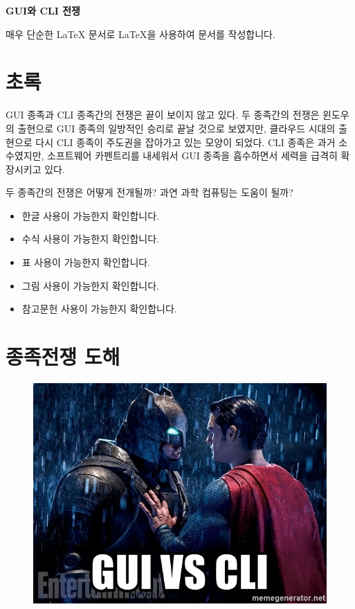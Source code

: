 \documentclass[12pt]{article}
\begin{document}
\textbf{GUI와 CLI 전쟁}

\bigskip

매우 단순한 \LaTeX\/ 문서로 \LaTeX\/을 사용하여 문서를 작성합니다.


\section{초록}

GUI 종족과 CLI 종족간의 전쟁은 끝이 보이지 않고 있다.
두 종족간의 전쟁은 윈도우의 출현으로 GUI 종족의 일방적인 승리로 끝날 것으로 보였지만, 클라우드 시대의 출현으로 다시 CLI 종족이 주도권을 잡아가고 있는 모양이 되었다.
CLI 종족은 과거 소수였지만, 소프트웨어 카펜트리\cite{DBLP:journals/corr/SimperlerW15}를 내세워서 GUI 종족을 흡수하면서 세력을 급격히 확장시키고 있다.

두 종족간의 전쟁은 어떻게 전개될까? 과연 과학 컴퓨팅\cite{10.1371/journal.pbio.1001745}는 도움이 될까?

\begin{itemize}
  \item 한글 사용이 가능한지 확인합니다.
  \item 수식 사용이 가능한지 확인합니다.
  \item 표 사용이 가능한지 확인합니다.
  \item 그림 사용이 가능한지 확인합니다.
  \item 참고문헌 사용이 가능한지 확인합니다.
\end{itemize}


\section{ 종족전쟁 도해}

\begin{figure} [!htb]
  \centerline{\includegraphics[width=\textwidth]{fig/gui-vs-cli.jpg}}
\end{figure}
\end{document}

